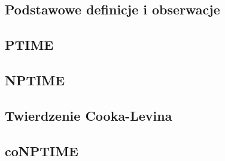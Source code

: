 \subsection{Podstawowe definicje i obserwacje}


\subsection{PTIME}


\subsection{NPTIME}


\subsection{Twierdzenie Cooka-Levina}
\label{cook}


\subsection{coNPTIME}
